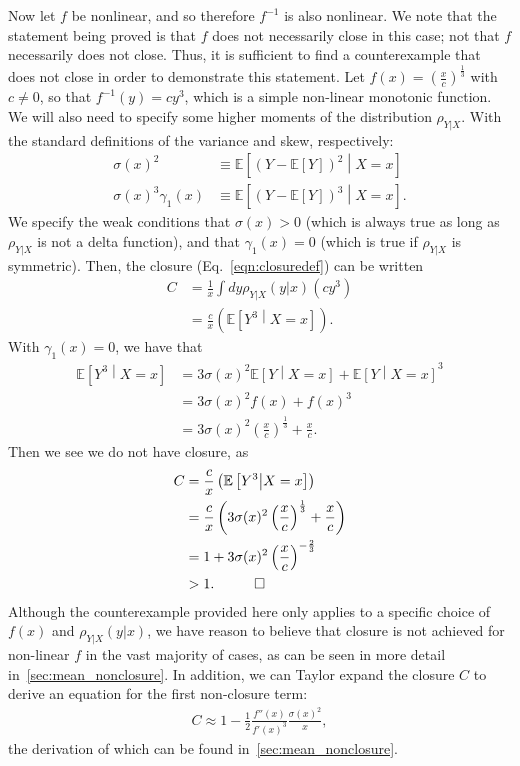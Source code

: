 Now let $f$ be nonlinear, and so therefore $f^{-1}$ is also nonlinear. We note that the statement being proved is that $f$ does not necessarily close in this case; not that $f$ necessarily does not close. Thus, it is sufficient to find a counterexample that does not close in order to demonstrate this statement. Let $f(x) = \left(\frac{x}{c}\right)^{\frac{1}{3}}$ with $c\ne 0$, so that $f^{-1}(y) = cy^3$, which is a simple non-linear monotonic function. We will also need to specify some higher moments of the distribution $\rho_{Y|X}$. With the standard definitions of the variance and skew, respectively:
\begin{align}
\sigma(x)^2&\equiv
\mathbb{E}\left[\left(Y-\mathbb{E}\left[Y\right]\right)^2\middle| X=x\right]\\
\sigma(x)^3\gamma_1(x) &\equiv \mathbb{E}\left[\left(Y-\mathbb{E}\left[Y\right]\right)^3\middle| X=x\right].
\end{align}
We specify the weak conditions that $\sigma(x) >0$ (which is always true as long as $\rho_{Y|X}$ is not a delta function), and that $\gamma_1(x)=0$ (which is true if $\rho_{Y|X}$ is symmetric).  Then, the closure (Eq.~\ref{eqn:closuredef}) can be written
\begin{align}
C &=\frac{1}{x} \int dy \rho_{Y|X}(y|x) \left(cy^3\right)\nonumber\\
&=\frac{c}{x} \left(\mathbb{E}\left[Y^3\middle| X=x\right]\right).
\end{align}
With $\gamma_1(x)=0$, we have that
\begin{align}
\mathbb{E}\left[Y^3\middle| X=x\right] &= 3\sigma(x)^2\mathbb{E}\left[Y\middle| X=x\right] + \mathbb{E}\left[Y\middle| X=x\right]^3\nonumber\\
&=3\sigma(x)^2f(x)+f(x)^3\nonumber\\
&=3\sigma(x)^2\left(\frac{x}{c}\right)^{\frac{1}{3}}+\frac{x}{c}.
\end{align}
Then we see we do not have closure, as
\begin{align}
C &=\frac{c}{x} \left(\mathbb{E}\left[Y^3\middle| X=x\right]\right)\nonumber\\
&=\frac{c}{x} \left(3\sigma(x)^2\left(\frac{x}{c}\right)^{\frac{1}{3}}+\frac{x}{c}\right)\nonumber\\
&= 1 + 3\sigma(x)^2\left(\frac{x}{c}\right)^{-\frac{2}{3}}\nonumber\\
&>1. \hspace{1 cm}\Box
\end{align}
Although the counterexample provided here only applies to a specific choice of $f(x)$ and $\rho_{Y|X}(y|x)$, we have reason to believe that closure is not achieved for non-linear $f$ in the vast majority of cases, as can be seen in more detail in~\ref{sec:mean_nonclosure}. In addition, we can Taylor expand the closure $C$ to derive an equation for the first non-closure term:
\begin{align}
C \approx 1-\frac{1}{2}\frac{f''(x)}{f'(x)^3}\frac{\sigma(x)^2}{x},
\label{eqn:closureseries_text}
\end{align}
the derivation of which can be found in~\ref{sec:mean_nonclosure}.

